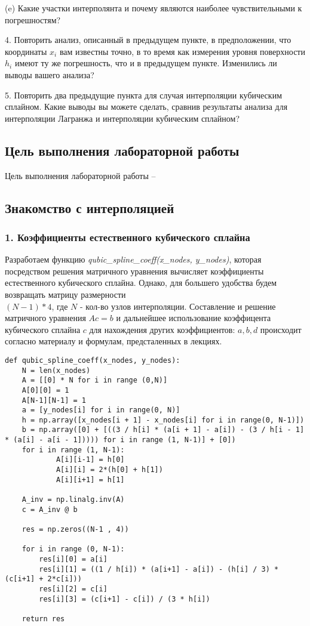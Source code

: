 \begin{flushleft}
(e) Какие участки интерполянта и почему являются наиболее чувствительными к погрешностям?
\end{flushleft}
\begin{flushleft}
4. Повторить анализ, описанный в предыдущем пункте, в предположении, что координаты $x_i$ вам известны точно, в то время как измерения уровня поверхности $h_i$ имеют ту же погрешность, что и в предыдущем пункте. Изменились ли выводы вашего анализа?
\end{flushleft}
\begin{flushleft}
5. Повторить два предыдущие пункта для случая интерполяции кубическим сплайном. Какие выводы вы можете сделать, сравнив результаты анализа для интерполяции Лагранжа и интерполяции кубическим сплайном?
\end{flushleft}
\clearpage
\subsection{Цель выполнения лабораторной работы}

Цель выполнения лабораторной работы -- \GoalOfResearch{}
\subsection{Знакомство с интерполяцией}
\subsubsection{1. Коэффициенты естественного
кубического сплайна}
Разработаем функцию \textit{qubic_spline_coeff(x_nodes, y_nodes)}, которая посредством решения матричного уравнения вычисляет коэффициенты естественного кубического сплайна. Однако, для большего удобства будем возвращать матрицу размерности \\ $(N-1) * 4$, где $N$ - кол-во узлов интерполяции.
Составление и решение матричного уравнения $Ac = b$ и дальнейшее использование коэффицента кубического сплайна $c$ для нахождения других коэффициентов: $a, b, d$ происходит согласно материалу и формулам, предсталенных в лекциях.
\begin{lstlisting}                 
def qubic_spline_coeff(x_nodes, y_nodes):
    N = len(x_nodes)
    A = [[0] * N for i in range (0,N)]
    A[0][0] = 1
    A[N-1][N-1] = 1
    a = [y_nodes[i] for i in range(0, N)]
    h = np.array([x_nodes[i + 1] - x_nodes[i] for i in range(0, N-1)])
    b = np.array([0] + [((3 / h[i] * (a[i + 1] - a[i]) - (3 / h[i - 1] * (a[i] - a[i - 1])))) for i in range (1, N-1)] + [0])
    for i in range (1, N-1):
            A[i][i-1] = h[0]
            A[i][i] = 2*(h[0] + h[1])
            A[i][i+1] = h[1]
    
    A_inv = np.linalg.inv(A)
    c = A_inv @ b
    
    res = np.zeros((N-1 , 4))
    
    for i in range (0, N-1):
        res[i][0] = a[i]
        res[i][1] = ((1 / h[i]) * (a[i+1] - a[i]) - (h[i] / 3) * (c[i+1] + 2*c[i]))
        res[i][2] = c[i]
        res[i][3] = (c[i+1] - c[i]) / (3 * h[i])
    
    return res         
\end{lstlisting}  
